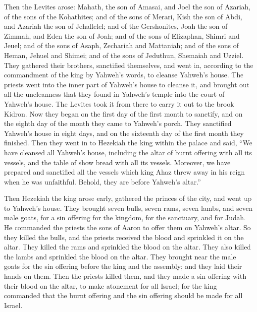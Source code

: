  Then the Levites arose: Mahath, the son of Amasai, and
Joel the son of Azariah, of the sons of the Kohathites; and of the sons
of Merari, Kish the son of Abdi, and Azariah the son of Jehallelel; and
of the Gershonites, Joah the son of Zimmah, and Eden the son of Joah;
 and of the sons of Elizaphan, Shimri and Jeuel; and of
the sons of Asaph, Zechariah and Mattaniah;  and of the
sons of Heman, Jehuel and Shimei; and of the sons of Jeduthun, Shemaiah
and Uzziel.  They gathered their brothers, sanctified
themselves, and went in, according to the commandment of the king by
Yahweh's words, to cleanse Yahweh's house.  The priests
went into the inner part of Yahweh's house to cleanse it, and brought
out all the uncleanness that they found in Yahweh's temple into the
court of Yahweh's house. The Levites took it from there to carry it out
to the brook Kidron.  Now they began on the first day of
the first month to sanctify, and on the eighth day of the month they
came to Yahweh's porch. They sanctified Yahweh's house in eight days,
and on the sixteenth day of the first month they finished.
 Then they went in to Hezekiah the king within the palace
and said, ``We have cleansed all Yahweh's house, including the altar of
burnt offering with all its vessels, and the table of show bread with
all its vessels.  Moreover, we have prepared and
sanctified all the vessels which king Ahaz threw away in his reign when
he was unfaithful. Behold, they are before Yahweh's altar.''

 Then Hezekiah the king arose early, gathered the princes
of the city, and went up to Yahweh's house.  They brought
seven bulls, seven rams, seven lambs, and seven male goats, for a sin
offering for the kingdom, for the sanctuary, and for Judah. He commanded
the priests the sons of Aaron to offer them on Yahweh's altar.
 So they killed the bulls, and the priests received the
blood and sprinkled it on the altar. They killed the rams and sprinkled
the blood on the altar. They also killed the lambs and sprinkled the
blood on the altar.  They brought near the male goats for
the sin offering before the king and the assembly; and they laid their
hands on them.  Then the priests killed them, and they
made a sin offering with their blood on the altar, to make atonement for
all Israel; for the king commanded that the burnt offering and the sin
offering should be made for all Israel.

